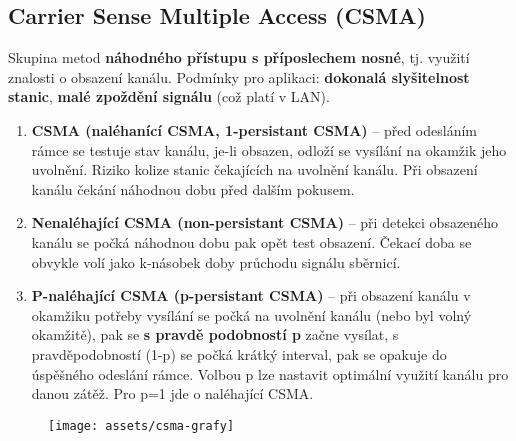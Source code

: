 \subsection{Carrier Sense Multiple Access (CSMA)}
Skupina metod \textbf{náhodného přístupu s příposlechem nosné}, tj. využití znalosti o obsazení kanálu. Podmínky pro aplikaci: \textbf{dokonalá slyšitelnost stanic}, \textbf{malé zpoždění signálu} (což platí v LAN).

\begin{enumerate}
    \item \textbf{CSMA (naléhanící CSMA, 1-persistant CSMA)} -- před odesláním rámce se testuje stav kanálu, je-li obsazen, odloží se vysílání na okamžik jeho uvolnění. Riziko kolize stanic čekajících na uvolnění kanálu. Při obsazení kanálu čekání náhodnou dobu před dalším pokusem.
    \item \textbf{Nenaléhající CSMA (non-persistant CSMA)} -- při detekci obsazeného kanálu se počká náhodnou dobu pak opět test obsazení. Čekací doba se obvykle volí jako k-násobek doby průchodu signálu sběrnicí.
    \item \textbf{P-naléhající CSMA (p-persistant CSMA)} -- při obsazení kanálu v okamžiku potřeby vysílání se počká na uvolnění kanálu (nebo byl volný okamžitě), pak se \textbf{s pravdě podobností p} začne vysílat, s pravděpodobností (1-p) se počká krátký interval, pak se opakuje do úspěšného odeslání rámce. Volbou p lze nastavit optimální využití kanálu pro danou zátěž. Pro p=1 jde o naléhající CSMA.
\end{enumerate}

\begin{figure}[H]
    \centering
    \texttt{[image: assets/csma-grafy]}
\end{figure}

